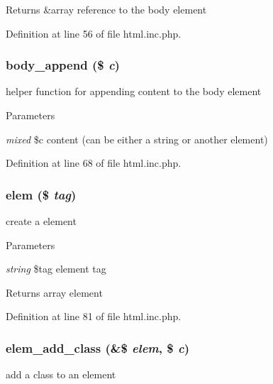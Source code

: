 \begin{DoxyReturn}{Returns}
\&array reference to the body element 
\end{DoxyReturn}


Definition at line 56 of file html.inc.php.

\hypertarget{html_8inc_8php_ad27881abf3a2004d287434d8c8d7cdf6}{
\subsubsection[{body\_\-append}]{\setlength{\rightskip}{0pt plus 5cm}body\_\-append (\$ {\em c})}}
\label{html_8inc_8php_ad27881abf3a2004d287434d8c8d7cdf6}
helper function for appending content to the body element


\begin{DoxyParams}{Parameters}
\item[{\em mixed}]\$c content (can be either a string or another element) \end{DoxyParams}


Definition at line 68 of file html.inc.php.

\hypertarget{html_8inc_8php_aa7a1256f84f937f1656195d5ce7b8d91}{
\subsubsection[{elem}]{\setlength{\rightskip}{0pt plus 5cm}elem (\$ {\em tag})}}
\label{html_8inc_8php_aa7a1256f84f937f1656195d5ce7b8d91}
create a element


\begin{DoxyParams}{Parameters}
\item[{\em string}]\$tag element tag \end{DoxyParams}
\begin{DoxyReturn}{Returns}
array element 
\end{DoxyReturn}


Definition at line 81 of file html.inc.php.

\hypertarget{html_8inc_8php_aafa12d2b690751666e599fb052e19ca6}{
\subsubsection[{elem\_\-add\_\-class}]{\setlength{\rightskip}{0pt plus 5cm}elem\_\-add\_\-class (\&\$ {\em elem}, \/  \$ {\em c})}}
\label{html_8inc_8php_aafa12d2b690751666e599fb052e19ca6}
add a class to an element


